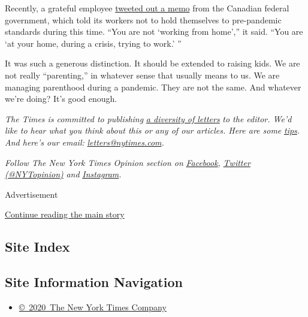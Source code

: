 Recently, a grateful employee
\href{https://twitter.com/slavetothehat/status/1259978637266366465}{tweeted
out a memo} from the Canadian federal government, which told its workers
not to hold themselves to pre-pandemic standards during this time. ``You
are not `working from home','' it said. ``You are `at your home, during
a crisis, trying to work.' ''

It was such a generous distinction. It should be extended to raising
kids. We are not really ``parenting,'' in whatever sense that usually
means to us. We are managing parenthood during a pandemic. They are not
the same. And whatever we're doing? It's good enough.

\emph{The Times is committed to publishing}
\href{https://www.nytimes.com/2019/01/31/opinion/letters/letters-to-editor-new-york-times-women.html}{\emph{a
diversity of letters}} \emph{to the editor. We'd like to hear what you
think about this or any of our articles. Here are some}
\href{https://help.nytimes.com/hc/en-us/articles/115014925288-How-to-submit-a-letter-to-the-editor}{\emph{tips}}\emph{.
And here's our email:}
\href{mailto:letters@nytimes.com}{\emph{letters@nytimes.com}}\emph{.}

\emph{Follow The New York Times Opinion section on}
\href{https://www.facebook.com/nytopinion}{\emph{Facebook}}\emph{,}
\href{http://twitter.com/NYTOpinion}{\emph{Twitter (@NYTopinion)}}
\emph{and}
\href{https://www.instagram.com/nytopinion/}{\emph{Instagram}}\emph{.}

Advertisement

\protect\hyperlink{after-bottom}{Continue reading the main story}

\hypertarget{site-index}{%
\subsection{Site Index}\label{site-index}}

\hypertarget{site-information-navigation}{%
\subsection{Site Information
Navigation}\label{site-information-navigation}}

\begin{itemize}
\tightlist
\item
  \href{https://help.nytimes.com/hc/en-us/articles/115014792127-Copyright-notice}{©~2020~The
  New York Times Company}
\end{itemize}

